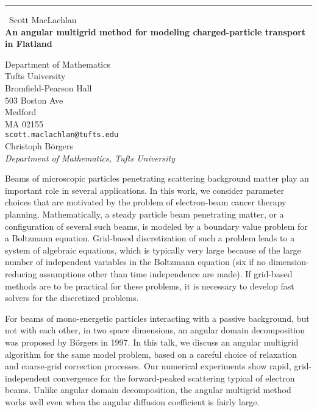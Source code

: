\documentclass{report}
\begin{document}
\begin{center}
\rule{6in}{1pt} \
{\large Scott MacLachlan \\
{\bf An angular multigrid method for modeling charged-particle transport in Flatland }}

Department of Mathematics \\ Tufts University \\ Bromfield-Pearson Hall \\ 503 Boston Ave \\ Medford \\ MA 02155
\\
{\tt scott.maclachlan@tufts.edu}\\
Christoph B\"orgers\\
{\em Department of Mathematics, Tufts University}\end{center}

Beams of microscopic particles penetrating scattering background matter
play an important role in several applications. In this work, we consider
parameter choices that are motivated by the problem of electron-beam
cancer therapy planning. Mathematically, a steady particle beam
penetrating matter, or a configuration of several such beams, is modeled
by a boundary value problem for a Boltzmann equation. Grid-based
discretization of such a problem leads to a system of algebraic
equations, which is typically very large because of the large number of
independent variables in the Boltzmann equation (six if no
dimension-reducing assumptions other than time independence are made). If
grid-based methods are to be practical for these problems, it is
necessary to develop fast solvers for the discretized problems.

For beams of mono-energetic particles interacting with a passive
background, but not with each other, in two space dimensions, an angular
domain decomposition was proposed by B\"orgers in 1997. In this talk, we
discuss an angular multigrid algorithm for the same model problem, based
on a careful choice of relaxation and coarse-grid correction processes.
Our numerical experiments show rapid, grid-independent convergence for
the forward-peaked scattering typical of electron beams. Unlike angular
domain decomposition, the angular multigrid method works well even when
the angular diffusion coefficient is fairly large.
\end{document}

